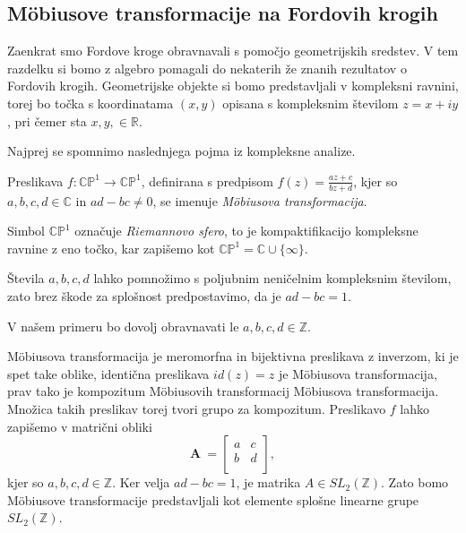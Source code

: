 \documentclass[mat1]{fmfdelo}
\begin{document}
\subsection{M\"{o}biusove transformacije na Fordovih krogih}

Zaenkrat smo Fordove kroge obravnavali s pomočjo geometrijskih sredstev. V tem razdelku si bomo z algebro pomagali do nekaterih že znanih rezultatov o Fordovih krogih.
Geometrijske objekte si bomo predstavljali v kompleksni ravnini, torej bo točka s koordinatama $(x,y)$ opisana s kompleksnim številom $z=x+iy$, pri čemer sta $x, y, \in \mathbb{R}$.

Najprej se spomnimo naslednjega pojma iz kompleksne analize.
\begin{definicija}
\label{def:MobTransformacija}
Preslikava \( f \colon \mathbb{CP}^{1} \rightarrow \mathbb{CP}^{1} \), definirana s predpisom \( f(z) = \frac{az+c}{bz+d} \), kjer so $a,b,c,d \in \mathbb{C}$ in $ad-bc \neq 0$, se imenuje \emph{M\"{o}biusova transformacija}.
\end{definicija} 

\begin{opomba}
Simbol $ \mathbb{CP}^{1}$ označuje \emph{Riemannovo sfero}, to je kompaktifikacijo kompleksne ravnine z eno točko, kar zapišemo kot $\mathbb{CP}^{1} = \mathbb{C} \cup \{\infty\}$.
\end{opomba}

\begin{opomba}
Števila $a,b,c,d$ lahko pomnožimo s poljubnim neničelnim kompleksnim številom, zato brez škode za splošnost predpostavimo, da je $ad-bc=1$.

V našem primeru bo dovolj obravnavati le $a,b,c,d \in \mathbb{Z}$.
\end{opomba}

M\"{o}biusova transformacija je meromorfna in bijektivna preslikava z inverzom, ki je spet take oblike, identična preslikava $id(z)=z$ je M\"{o}biusova transformacija, prav tako je kompozitum M\"{o}biusovih transformacij M\"{o}biusova transformacija. Množica takih preslikav torej tvori grupo za kompozitum. 
Preslikavo $f$ lahko zapišemo v matrični obliki
\[
\mathbf{A}\ =
\left[
\begin{array}{cc}
a & c \\
b & d \\
\end{array}
\right],
\]
kjer so $a,b,c,d \in \mathbb{Z}$. Ker velja $ad-bc=1$, je matrika $A \in {SL}_{2}(\mathbb{Z})$. Zato bomo M\"{o}biusove transformacije predstavljali kot elemente splošne linearne grupe ${SL}_{2}(\mathbb{Z})$.
\end{document}
